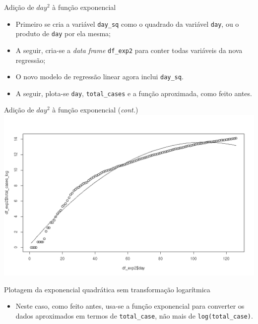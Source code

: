 \documentclass[a4paper,10pt]{beamer}
\begin{document}
\begin{frame}{ Adição de {\tt $day^2$} à função exponencial}
  
  
  \begin{itemize}
      \item Primeiro se cria a variável {\tt day\_sq} como o quadrado da 
	  variável {\tt day}, ou o produto de {\tt day} por ela mesma;
      \item A seguir, cria-se a {\em data frame} {\tt df\_exp2} para 
	  conter todas variáveis da nova regressão;
      \item O novo modelo de regressão linear agora inclui {\tt day\_sq}.
      \item A seguir, plota-se {\tt day}, {\tt total\_cases} e a 
	  função aproximada, como feito antes.
	  
  \end{itemize}

\end{frame}

\begin{frame}{ Adição de {\tt $day^2$} à função exponencial ({\em cont.}) }
  \includegraphics[scale=0.375]{plot-exp2.png}

\end{frame}

\begin{frame}{ Plotagem da exponencial quadrática sem transformação logarítmica}
  
  
  \begin{itemize}
      \item Neste caso, como feito antes, usa-se a função exponencial para 
	  converter os dados aproximados em termos de {\tt total\_case}, não
	  mais de {\tt log(total\_case)}.
  \end{itemize}

\end{frame}
\end{document}

